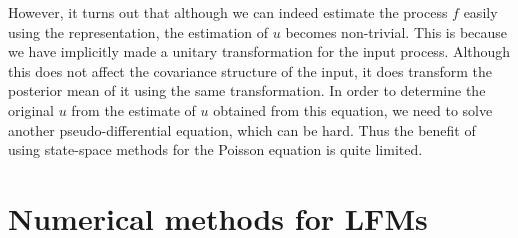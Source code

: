 \documentclass[journal]{IEEEtran}
\begin{document}
However, it turns out that although we can indeed estimate the process $f$ easily using the representation, the estimation of $u$ becomes non-trivial. This is because we have implicitly made a unitary transformation for the input process. Although this does not affect the covariance structure of the input, it does transform the posterior mean of it using the same transformation. In order to determine the original $u$ from the estimate of $u$ obtained from this equation, we need to solve another pseudo-differential equation, which can be hard. Thus the benefit of using state-space methods for the Poisson equation is quite limited. 

%
%

\section{Numerical methods for LFMs}
\end{document}
